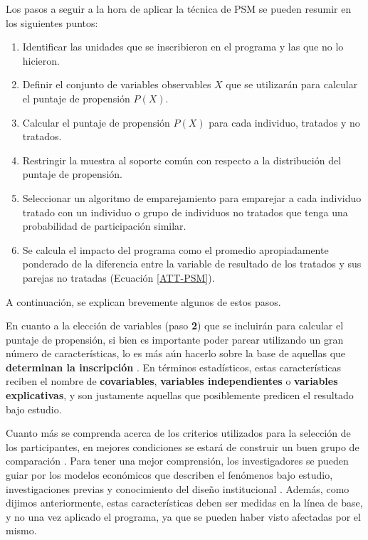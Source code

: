 \documentclass[../../main.tex]{subfiles}
\begin{document}
Los pasos a seguir a la hora de aplicar la técnica de PSM se pueden resumir en los
siguientes puntos:
\begin{enumerate}[label=\textbf{\arabic*.}]
    \item Identificar las unidades que se inscribieron en el programa y las que no lo
    hicieron.
    \item Definir el conjunto de variables observables \(X\) que se utilizarán para
    calcular el puntaje de propensión \(P(X)\).
    \item Calcular el puntaje de propensión \(P(X)\) para cada individuo, tratados
    y no tratados.
    \item Restringir la muestra al soporte común con respecto a la distribución
    del puntaje de propensión.
    \item Seleccionar un algoritmo de emparejamiento para emparejar a cada individuo
    tratado con un individuo o grupo de individuos no tratados que tenga una probabilidad
    de participación similar.
    \item Se calcula el impacto del programa como el promedio apropiadamente
    ponderado de la diferencia entre la variable de resultado de los tratados y
    sus parejas no tratadas (Ecuación \ref{ATT-PSM}).
\end{enumerate}
A continuación, se explican brevemente algunos de estos pasos.

En cuanto a la elección de variables (paso \textbf{2}) que se incluirán para calcular el puntaje de
propensión, si bien es importante poder parear utilizando un gran número de
características, lo es más aún hacerlo sobre la base de aquellas que \textbf{determinan la
inscripción} \cite{gertler-2016}.  En términos estadísticos, estas características reciben
el nombre de \textbf{covariables}, \textbf{variables independientes} o \textbf{ variables
explicativas}, y son justamente aquellas que posiblemente predicen el resultado bajo
estudio.

Cuanto más se comprenda acerca de los criterios utilizados para la selección de los
participantes, en mejores condiciones se estará de construir un buen grupo de comparación
\cite{gertler-2016}. Para tener una mejor comprensión, los investigadores se pueden guiar
por los modelos económicos que describen el fenómenos bajo estudio, investigaciones
previas y conocimiento del diseño institucional \cite{bernal}. Además, como dijimos
anteriormente, estas características deben ser medidas en la línea de base, y no una vez
aplicado el programa, ya que se pueden haber visto afectadas por el mismo.
\end{document}
